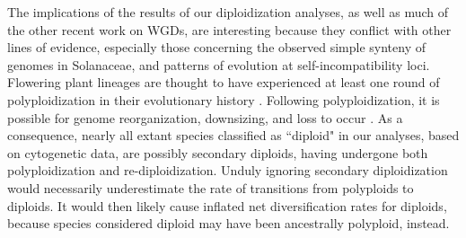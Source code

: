 
The implications of the results of our diploidization analyses, as well as much of the other recent work on WGDs, are interesting because they conflict with other lines of evidence, especially those concerning the observed simple synteny of genomes in Solanaceae, and patterns of evolution at self-incompatibility loci.
Flowering plant lineages are thought to have experienced at least one round of polyploidization in their evolutionary history \citep{soltis_2015}. 
Following polyploidization, it is possible for genome reorganization, downsizing, and loss to occur \citep{dodsworth_2015, zenil_2016, mandakova_2018}. %
As a consequence, nearly all extant species classified as ``diploid" in our analyses, based on cytogenetic data, are possibly secondary diploids, having undergone both polyploidization and re-diploidization.
Unduly ignoring secondary diploidization would necessarily underestimate the rate of transitions from polyploids to diploids.
It would then likely cause inflated net diversification rates for diploids, because species considered diploid may have been ancestrally polyploid, instead. %
